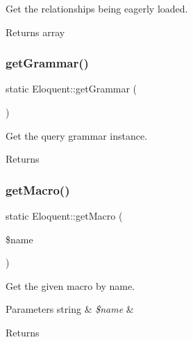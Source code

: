 Get the relationships being eagerly loaded.

\begin{DoxyReturn}{Returns}
array 
\end{DoxyReturn}
\mbox{\label{class_eloquent_ad1d4b842e0773138ab7660b968cc180b}} 
\subsubsection{\texorpdfstring{get\+Grammar()}{getGrammar()}}
{\footnotesize\ttfamily static Eloquent\+::get\+Grammar (\begin{DoxyParamCaption}{ }\end{DoxyParamCaption})\hspace{0.3cm}{\ttfamily [static]}}

Get the query grammar instance.

\begin{DoxyReturn}{Returns}

\end{DoxyReturn}
\mbox{\label{class_eloquent_a14eeb1ef9d588a63a99e7e2824cae2bb}} 
\subsubsection{\texorpdfstring{get\+Macro()}{getMacro()}}
{\footnotesize\ttfamily static Eloquent\+::get\+Macro (\begin{DoxyParamCaption}\item[{}]{\$name }\end{DoxyParamCaption})\hspace{0.3cm}{\ttfamily [static]}}

Get the given macro by name.


\begin{DoxyParams}[1]{Parameters}
string & {\em \$name} & \\
\hline
\end{DoxyParams}
\begin{DoxyReturn}{Returns}

\end{DoxyReturn}
\mbox{\label{class_eloquent_ab711475432b10dd5e0b8992dd4b47b64}} 
